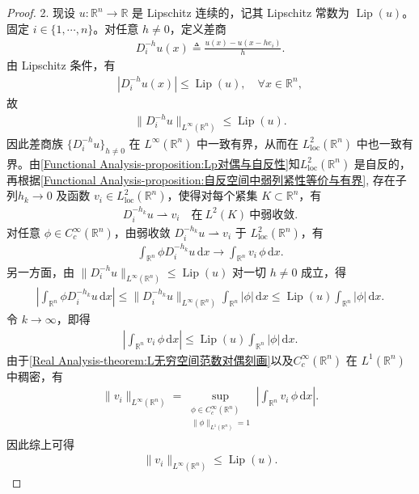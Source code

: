 \documentclass[../../main.tex]{subfiles}
\begin{document}
\begin{proof}
2. 现设 $u:\mathbb{R}^{n}\to\mathbb{R}$ 是 Lipschitz 连续的，记其 Lipschitz 常数为 $\operatorname{Lip}(u)$。固定 $i\in\{1,\cdots,n\}$。对任意 $h\neq 0$，定义差商
\begin{align*}
D_{i}^{-h}u(x)\triangleq\frac{u(x)-u(x-he_{i})}{h}.
\end{align*}
由 Lipschitz 条件，有
\begin{align*}
|D_{i}^{-h}u(x)|\leqslant\operatorname{Lip}(u),\quad \forall x\in\mathbb{R}^{n},
\end{align*}
故
\begin{align*}
\|D_{i}^{-h}u\|_{L^{\infty}(\mathbb{R}^{n})}\leqslant\operatorname{Lip}(u).
\end{align*}
因此差商族 $\{D_{i}^{-h}u\}_{h\neq 0}$ 在 $L^{\infty}(\mathbb{R}^{n})$ 中一致有界，从而在 $L^{2}_{\mathrm{loc}}(\mathbb{R}^{n})$ 中也一致有界。由\cref{Functional Analysis-proposition:Lp对偶与自反性}知$L^{2}_{\mathrm{loc}}(\mathbb{R}^{n})$ 是自反的，再根据\cref{Functional Analysis-proposition:自反空间中弱列紧性等价与有界}, 存在子列$h_{k}\to 0$ 及函数 $v_{i}\in L^{2}_{\mathrm{loc}}(\mathbb{R}^{n})$，使得对每个紧集 $K\subset\mathbb{R}^{n}$，有
\begin{align*}
D_{i}^{-h_{k}}u\rightharpoonup v_{i}\quad\text{在}\ L^{2}(K)\ \text{中弱收敛}.
\end{align*}
对任意 $\phi\in C_c^\infty(\mathbb{R}^n)$，由弱收敛 $D_i^{-h_k}u\rightharpoonup v_i$ 于 $L^2_{\mathrm{loc}}(\mathbb{R}^n)$，有
\begin{align*}
\int_{\mathbb{R}^n}\phi D_i^{-h_k}u\,\mathrm{d}x
\to \int_{\mathbb{R}^n}v_i\,\phi\,\mathrm{d}x.
\end{align*}
另一方面，由 $\|D_i^{-h}u\|_{L^\infty(\mathbb{R}^n)}\leqslant \operatorname{Lip}(u)$ 对一切 $h\neq 0$ 成立，得
\begin{align*}
\left|\int_{\mathbb{R}^n}\phi D_i^{-h_k}u\,\mathrm{d}x\right|
\leqslant \|D_i^{-h_k}u\|_{L^\infty(\mathbb{R}^n)}\int_{\mathbb{R}^n}|\phi|\,\mathrm{d}x
\leqslant \operatorname{Lip}(u)\int_{\mathbb{R}^n}|\phi|\,\mathrm{d}x.
\end{align*}
令 $k\to\infty$，即得
\begin{align*}
\left|\int_{\mathbb{R}^n}v_i\,\phi\,\mathrm{d}x\right|
\leqslant \operatorname{Lip}(u)\int_{\mathbb{R}^n}|\phi|\,\mathrm{d}x.
\end{align*}
由于\cref{Real Analysis-theorem:L无穷空间范数对偶刻画}以及$C_c^\infty(\mathbb{R}^n)$ 在 $L^1(\mathbb{R}^n)$ 中稠密，有
\begin{align*}
\|v_i\|_{L^\infty(\mathbb{R}^n)}
=\sup_{\substack{\phi\in C_c^\infty(\mathbb{R}^n)\\ \|\phi\|_{L^1(\mathbb{R}^n)}= 1}}
\left|\int_{\mathbb{R}^n}v_i\,\phi\,\mathrm{d}x\right|.
\end{align*}
因此综上可得
\begin{align*}
\|v_i\|_{L^\infty(\mathbb{R}^n)}\leqslant \operatorname{Lip}(u).
\end{align*}


\end{proof}
\end{document}
